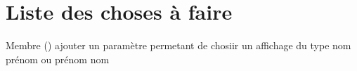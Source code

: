 \chapter{Liste des choses à faire}
\hypertarget{todo}{}\label{todo}

\begin{DoxyRefList}
\item[Membre \doxylink{class_individu_a3277118a71f354a107961e3b4975d631}{Individu\+::to\+String} ()]\label{todo__todo000001}%
%
ajouter un paramètre permetant de chosiir un affichage du type nom prénom ou prénom nom 
\end{DoxyRefList}